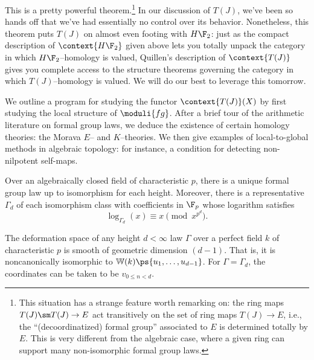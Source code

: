 This is a pretty powerful theorem.\footnote{This situation has a strange feature worth remarking on: the ring maps $T(J) \sm T(J) \to E$ act transitively on the set of ring maps $T(J) \to E$, i.e., the ``(decoordinatized) formal group'' associated to $E$ is determined totally by $E$.  This is very different from the algebraic case, where a given ring can support many non-isomorphic formal group laws.}  In our discussion of $T(J)$, we've been so hands off that we've had essentially no control over its behavior.  Nonetheless, this theorem puts $T(J)$ on almost even footing with $H\F_2$: just as the compact description of $\context{H\F_2}$ given above lets you totally unpack the category in which $H\F_2$--homology is valued, Quillen's description of $\context{T(J)}$ gives you complete access to the structure theorems governing the category in which $T(J)$--homology is valued.  We will do our best to leverage this tomorrow.













\newpage
{}


We outline a program for studying the functor $\context{T(J)}(X)$ by first studying the local structure of $\moduli{fg}$.  After a brief tour of the arithmetic literature on formal group laws, we deduce the existence of certain homology theories: the Morava $E$-- and $K$--theories.  We then give examples of local-to-global methods in algebraic topology: for instance, a condition for detecting non-nilpotent self-maps.




\begin{theorem}
Over an algebraically closed field of characteristic $p$, there is a unique formal group law up to isomorphism for each height.  Moreover, there is a representative $\Gamma_d$ of each isomorphism class with coefficients in $\F_p$ whose logarithm satisfies \[\log_{\Gamma_d}(x) \equiv x \pmod{x^{p^d}}.\]
\end{theorem}

\begin{theorem}
The deformation space of any height $d < \infty$ law $\Gamma$ over a perfect field $k$ of characteristic $p$ is smooth of geometric dimension $(d-1)$.  That is, it is noncanonically isomorphic to $\mathbb W(k)\ps{u_1, \ldots, u_{d-1}}$.  For $\Gamma = \Gamma_d$, the coordinates can be taken to be $v_{0 \le n < d}$.
\end{theorem}

